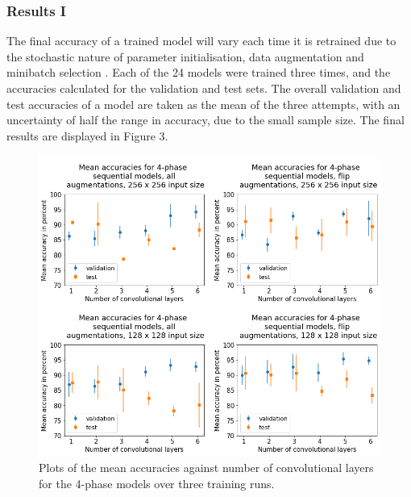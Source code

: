 \documentclass[12pt]{article}
\begin{document}
\subsubsection{Results I}
The final accuracy of a trained model will vary each time it is retrained due to the stochastic nature of parameter initialisation, data augmentation and minibatch selection \cite{Goodfellow16}. Each of the 24 models were trained three times, and the accuracies calculated for the validation and test sets. The overall validation and test accuracies of a model are taken as the mean of the three attempts, with an uncertainty of half the range in accuracy, due to the small sample size. The final results are displayed in Figure 3.
\begin{figure}[!htb]
	\centering
    \includegraphics[width=6.6in]{images/4-phase_graphs.png}
    \caption{Plots of the mean accuracies against number of convolutional layers for the 4-phase models over three training runs.}
\end{figure} 
\end{document}
